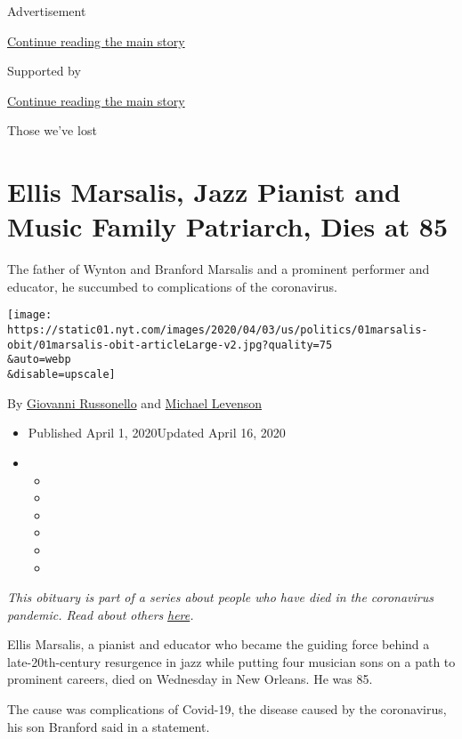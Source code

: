 Advertisement

\protect\hyperlink{after-top}{Continue reading the main story}

Supported by

\protect\hyperlink{after-sponsor}{Continue reading the main story}

Those we've lost

\hypertarget{ellis-marsalis-jazz-pianist-and-music-family-patriarch-dies-at-85}{%
\section{Ellis Marsalis, Jazz Pianist and Music Family Patriarch, Dies
at
85}\label{ellis-marsalis-jazz-pianist-and-music-family-patriarch-dies-at-85}}

The father of Wynton and Branford Marsalis and a prominent performer and
educator, he succumbed to complications of the coronavirus.

\texttt{[image: https://static01.nyt.com/images/2020/04/03/us/politics/01marsalis-obit/01marsalis-obit-articleLarge-v2.jpg?quality=75\\\&auto=webp\\\&disable=upscale]}

By \href{https://www.nytimes.com/by/giovanni-russonello}{Giovanni
Russonello} and
\href{https://www.nytimes.com/by/michael-levenson}{Michael Levenson}

\begin{itemize}
\item
  Published April 1, 2020Updated April 16, 2020
\item
  \begin{itemize}
  \item
  \item
  \item
  \item
  \item
  \item
  \end{itemize}
\end{itemize}

\emph{This obituary is part of a series about people who have died in
the coronavirus pandemic. Read about others}
\href{https://www.nytimes.com/series/people-who-have-died-of-the-coronavirus}{\emph{here}}\emph{.}

Ellis Marsalis, a pianist and educator who became the guiding force
behind a late-20th-century resurgence in jazz while putting four
musician sons on a path to prominent careers, died on Wednesday in New
Orleans. He was 85.

The cause was complications of Covid-19, the disease caused by the
coronavirus, his son Branford said in a statement.

